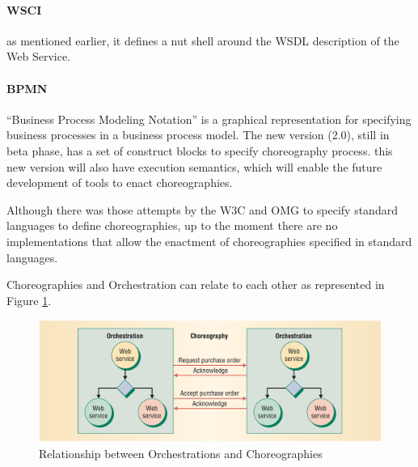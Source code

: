 \paragraph{WSCI}
as mentioned earlier, it defines a nut shell around the WSDL description of the Web Service.

\paragraph{BPMN}
``Business Process Modeling Notation'' is a graphical representation for specifying business processes in a business process model. The new version (2.0), still in beta phase, has a set of construct blocks to specify choreography process. this new version will also have execution semantics, which will enable the future development of tools to enact choreographies.

Although there was those attempts by the W3C and OMG to specify standard languages to define choreographies, up to the moment there are no implementations that allow the enactment of choreographies specified in standard languages.

Choreographies and Orchestration can relate to each other as represented in Figure \ref{relation-orchestrationXchoreography}.


\begin{figure}[htb]
	\centering
	\includegraphics[width=\textwidth]{images/relation-orchestrationXchoreography}
	\caption{Relationship between Orchestrations and Choreographies}
	\label{relation-orchestrationXchoreography}
\end{figure}




